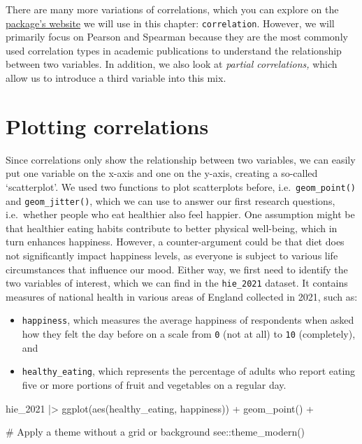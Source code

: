\documentclass[
  letterpaper,
  DIV=11,
  numbers=noendperiod]{scrreprt}
\newenvironment{Shaded}{\begin{snugshade}}{\end{snugshade}}
\newcommand{\CommentTok}[1]{\textcolor[rgb]{0.37,0.37,0.37}{#1}}
\newcommand{\FunctionTok}[1]{\textcolor[rgb]{0.28,0.35,0.67}{#1}}
\newcommand{\NormalTok}[1]{\textcolor[rgb]{0.00,0.23,0.31}{#1}}
\newcommand{\SpecialCharTok}[1]{\textcolor[rgb]{0.37,0.37,0.37}{#1}}
\begin{document}
\endgroup

There are many more variations of correlations, which you can explore on
the
\href{https://easystats.github.io/correlation/articles/types.html}{package's
website} we will use in this chapter: \texttt{correlation}. However, we
will primarily focus on Pearson and Spearman because they are the most
commonly used correlation types in academic publications to understand
the relationship between two variables. In addition, we also look at
\emph{partial correlations,} which allow us to introduce a third
variable into this mix.

\section{Plotting correlations}\label{sec-plotting-correlations}

Since correlations only show the relationship between two variables, we
can easily put one variable on the x-axis and one on the y-axis,
creating a so-called `scatterplot'. We used two functions to plot
scatterplots before, i.e.~\texttt{geom\_point()} and
\texttt{geom\_jitter()}, which we can use to answer our first research
questions, i.e.~whether people who eat healthier also feel happier. One
assumption might be that healthier eating habits contribute to better
physical well-being, which in turn enhances happiness. However, a
counter-argument could be that diet does not significantly impact
happiness levels, as everyone is subject to various life circumstances
that influence our mood. Either way, we first need to identify the two
variables of interest, which we can find in the \texttt{hie\_2021}
dataset. It contains measures of national health in various areas of
England collected in 2021, such as:

\begin{itemize}
\item
  \texttt{happiness}, which measures the average happiness of
  respondents when asked how they felt the day before on a scale from
  \texttt{0} (not at all) to \texttt{10} (completely), and
\item
  \texttt{healthy\_eating}, which represents the percentage of adults
  who report eating five or more portions of fruit and vegetables on a
  regular day.
\end{itemize}

\begin{Shaded}
\begin{Highlighting}[]
\NormalTok{hie\_2021 }\SpecialCharTok{|\textgreater{}}
  \FunctionTok{ggplot}\NormalTok{(}\FunctionTok{aes}\NormalTok{(healthy\_eating, happiness)) }\SpecialCharTok{+}
  \FunctionTok{geom\_point}\NormalTok{() }\SpecialCharTok{+}
  
  \CommentTok{\# Apply a theme without a grid or background}
\NormalTok{  see}\SpecialCharTok{::}\FunctionTok{theme\_modern}\NormalTok{()}
\end{Highlighting}
\end{Shaded}
\end{document}
